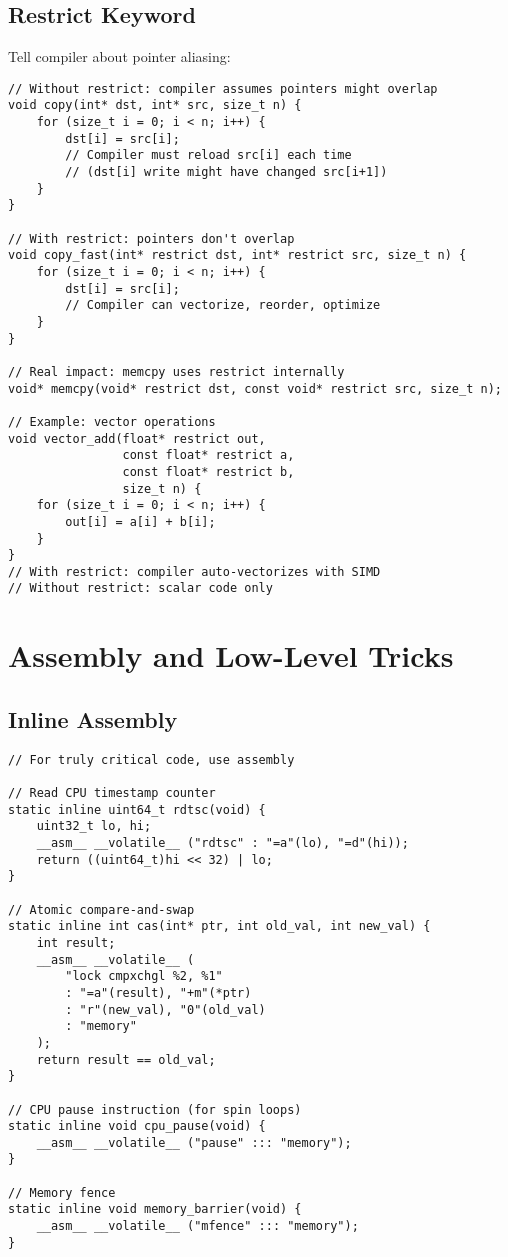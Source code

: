 \subsection{Restrict Keyword}

Tell compiler about pointer aliasing:

\begin{lstlisting}
// Without restrict: compiler assumes pointers might overlap
void copy(int* dst, int* src, size_t n) {
    for (size_t i = 0; i < n; i++) {
        dst[i] = src[i];
        // Compiler must reload src[i] each time
        // (dst[i] write might have changed src[i+1])
    }
}

// With restrict: pointers don't overlap
void copy_fast(int* restrict dst, int* restrict src, size_t n) {
    for (size_t i = 0; i < n; i++) {
        dst[i] = src[i];
        // Compiler can vectorize, reorder, optimize
    }
}

// Real impact: memcpy uses restrict internally
void* memcpy(void* restrict dst, const void* restrict src, size_t n);

// Example: vector operations
void vector_add(float* restrict out,
                const float* restrict a,
                const float* restrict b,
                size_t n) {
    for (size_t i = 0; i < n; i++) {
        out[i] = a[i] + b[i];
    }
}
// With restrict: compiler auto-vectorizes with SIMD
// Without restrict: scalar code only
\end{lstlisting}

\section{Assembly and Low-Level Tricks}

\subsection{Inline Assembly}

\begin{lstlisting}
// For truly critical code, use assembly

// Read CPU timestamp counter
static inline uint64_t rdtsc(void) {
    uint32_t lo, hi;
    __asm__ __volatile__ ("rdtsc" : "=a"(lo), "=d"(hi));
    return ((uint64_t)hi << 32) | lo;
}

// Atomic compare-and-swap
static inline int cas(int* ptr, int old_val, int new_val) {
    int result;
    __asm__ __volatile__ (
        "lock cmpxchgl %2, %1"
        : "=a"(result), "+m"(*ptr)
        : "r"(new_val), "0"(old_val)
        : "memory"
    );
    return result == old_val;
}

// CPU pause instruction (for spin loops)
static inline void cpu_pause(void) {
    __asm__ __volatile__ ("pause" ::: "memory");
}

// Memory fence
static inline void memory_barrier(void) {
    __asm__ __volatile__ ("mfence" ::: "memory");
}
\end{lstlisting}

